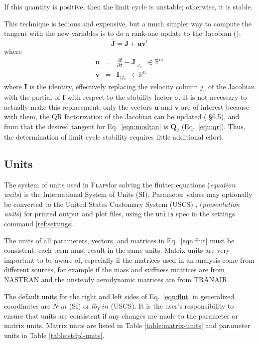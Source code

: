 \documentclass[11pt,openany,twoside]{book}
\numberwithin{equation}{section}		%
\newcommand{\Cmd}[1]{{\sf #1}}
\newcommand{\Newterm}[1]{{\em #1}}	%
\newcommand{\Code}[1]{{\small\tt #1}}
\newcommand{\Flaps}{\textsc{Flaps\:}}
\newcommand{\Nastran}{{\footnotesize{NASTRAN\:}}}
\newcommand{\Matrix}[1]{\boldsymbol{#1}}
\newcommand{\Vector}[1]{\boldsymbol{#1}}
\newcommand{\Eqn}[1]{Eq.\ \ref{#1}}  %
\newcommand{\Tableref}[1]{Table \ref{#1}}
\begin{document}
If this quantity is positive, then the limit cycle is unstable; otherwise,
it is stable.
\par
This technique is tedious and expensive, but
a much simpler way to compute the tangent with the new variables is to do
a rank-one update to the Jacobian (\cite{golub2013matrix}):
\begin{equation}
\hat{\Matrix{J}} = \Matrix{J} + \Vector{u}\Vector{v}^t
\end{equation}
where
\begin{eqnarray}
\Vector{u} &=& \frac{\partial \Vector{f}}{\partial \sigma} - \Matrix{J}_{:j_v} \;\; \in \mathbb{R}^m \nonumber \\
\Vector{v} &=& \Matrix{I}_{:j_v} \;\; \in \mathbb{R}^n
\end{eqnarray}
where $\Matrix{I}$ is the identity,
effectively replacing the velocity column $j_v$ of the Jacobian with the partial
of $\Vector{f}$ with respect to the stability factor $\sigma$.
It is not necessary to actually make this replacement; only the vectors
$\Vector{u}$ and $\Vector{v}$ are of interest because with them,
the QR factorization of the
Jacobian can be updated (\cite{golub2013matrix} \S 6.5), and from that the desired
tangent for \Eqn{eqn:modtan} is $\Matrix{Q}_2$ (\Eqn{eqn:qr}).
Thus, the determination of limit cycle stability requires little additional effort.

\subsection{Units}\label{sect:units}
The system of units used in \Flaps for solving the flutter
equations (\Newterm{equation units}) is the International
System of Units (SI).
Parameter values may optionally be converted to
the United States Customary System (USCS)
\cite{handbook2002specifications},
(\Newterm{presentation units})
for printed output and plot files, using the \Code{units} spec
in the \Cmd{settings} command \ref{ref:settings}.

The units of all parameters, vectors, and matrices in
\Eqn{eqn:flut} must be consistent: each
term must result in the same units.
Matrix units are very important to be aware of, especially
if the matrices used in an analysis come from different sources,
for example if the mass and stiffness matrices are from \Nastran
and the unsteady aerodynamic matrices are from TRANAIR.
\par
The default units for the right and left sides of \Eqn{eqn:flut} in
generalized coordinates are
$N\text{-}m$ (SI) or $lb_f\text{-}in$ (USCS).
It is the user's responsibility to ensure that units are
consistent if any changes are made to the parameter or matrix units.
Matrix units are listed in \Tableref{table:matrix-units} and parameter
units in \Tableref{table:stdpl-units}.
\end{document}
